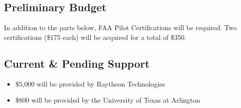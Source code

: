 
\subsection{Preliminary Budget}
In addition to the parts below, FAA Pilot Certifications will be required. Two certifications (\$175 each) will be acquired for a total of \$350.

\subsection{Current \& Pending Support}
\begin{itemize}
  \item \$5,000 will be provided by Raytheon Technologies
  \item \$800 will be provided by the University of Texas at Arlington
\end{itemize}
